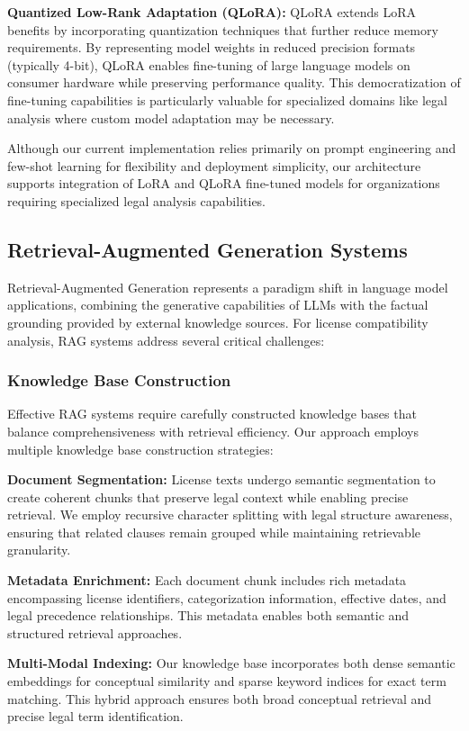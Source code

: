 \documentclass[9pt,twocolumn]{article}
\begin{document}
\textbf{Quantized Low-Rank Adaptation (QLoRA):} QLoRA extends LoRA benefits by incorporating quantization techniques that further reduce memory requirements. By representing model weights in reduced precision formats (typically 4-bit), QLoRA enables fine-tuning of large language models on consumer hardware while preserving performance quality. This democratization of fine-tuning capabilities is particularly valuable for specialized domains like legal analysis where custom model adaptation may be necessary.

Although our current implementation relies primarily on prompt engineering and few-shot learning for flexibility and deployment simplicity, our architecture supports integration of LoRA and QLoRA fine-tuned models for organizations requiring specialized legal analysis capabilities.

\subsection{Retrieval-Augmented Generation Systems}
Retrieval-Augmented Generation represents a paradigm shift in language model applications, combining the generative capabilities of LLMs with the factual grounding provided by external knowledge sources. For license compatibility analysis, RAG systems address several critical challenges:

\subsubsection{Knowledge Base Construction}
Effective RAG systems require carefully constructed knowledge bases that balance comprehensiveness with retrieval efficiency. Our approach employs multiple knowledge base construction strategies:

\textbf{Document Segmentation:} License texts undergo semantic segmentation to create coherent chunks that preserve legal context while enabling precise retrieval. We employ recursive character splitting with legal structure awareness, ensuring that related clauses remain grouped while maintaining retrievable granularity.

\textbf{Metadata Enrichment:} Each document chunk includes rich metadata encompassing license identifiers, categorization information, effective dates, and legal precedence relationships. This metadata enables both semantic and structured retrieval approaches.

\textbf{Multi-Modal Indexing:} Our knowledge base incorporates both dense semantic embeddings for conceptual similarity and sparse keyword indices for exact term matching. This hybrid approach ensures both broad conceptual retrieval and precise legal term identification.
\end{document}

